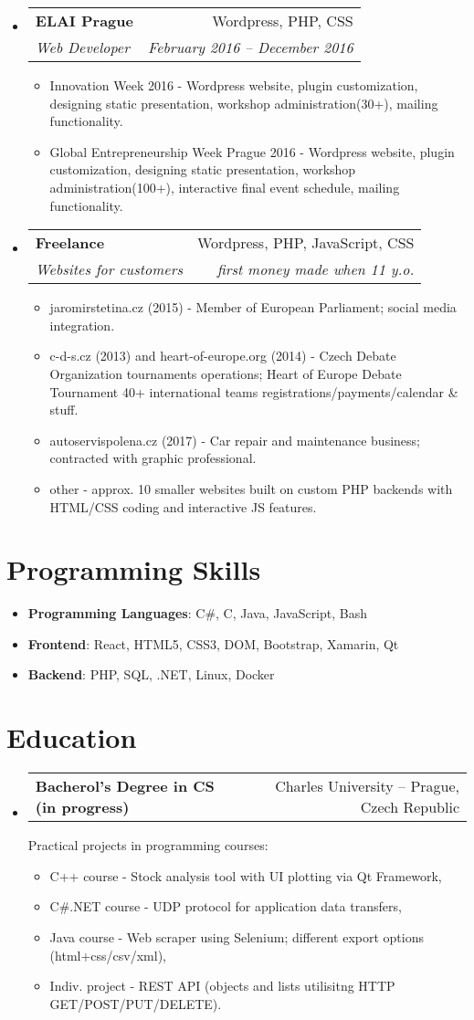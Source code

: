 \documentclass[letterpaper,11pt]{article}
\makeatletter
\newcommand{\sitem}[1]{\item #1 \vspace{-2pt}}
\newcommand{\resumeSubheading}[4]{
  \vspace{-1pt}\item
    \begin{tabular*}{0.97\textwidth}[t]{l@{\extracolsep{\fill}}r}
      \textbf{#1} & #2 \\
      \textit{\small#3} & \textit{\small #4} \\
    \end{tabular*}\vspace{-5pt}
}
\newcommand{\resumeSubheadingg}[2]{
  \vspace{-1pt}\item
    \begin{tabular*}{0.97\textwidth}[t]{l@{\extracolsep{\fill}}r}
      \textbf{#1} & #2
    \end{tabular*}\vspace{-5pt}
}
\newenvironment{subheadingListing}{\begin{itemize}[leftmargin=*]}{\end{itemize}}
\newenvironment{resumeList}{\begin{itemize}}{\end{itemize}\vspace{-5pt}}
\newcommand{\CC}{C\nolinebreak\hspace{-.05em}\raisebox{.4ex}{\tiny\bf +}\nolinebreak\hspace{-.10em}\raisebox{.4ex}{\tiny\bf +}}
\makeatother
\begin{document}
\begin{subheadingListing}
  \resumeSubheading
  {ELAI Prague}{Wordpress, PHP, CSS}
  {Web Developer}{February 2016 – December 2016}
  \begin{resumeList}
    \sitem{Innovation Week 2016 - Wordpress website, plugin customization, designing static presentation, workshop administration(30+), mailing functionality.}
    \sitem{Global Entrepreneurship Week Prague 2016 - Wordpress website, plugin customization, designing static presentation, workshop administration(100+), interactive final event schedule, mailing functionality.}
  \end{resumeList}

  \resumeSubheading
  {Freelance}{Wordpress, PHP, JavaScript, CSS}
  {Websites for customers}{first money made when 11 y.o.}
  \begin{resumeList}
    \sitem{jaromirstetina.cz (2015) - Member of European Parliament; social media integration.}
    \sitem{c-d-s.cz (2013) and heart-of-europe.org (2014) - Czech Debate Organization tournaments operations; Heart of Europe Debate Tournament 40+ international teams registrations/payments/calendar \& stuff. }
    \sitem{autoservispolena.cz (2017) - Car repair and maintenance business; contracted with graphic professional.}  
    \sitem{other - approx. 10 smaller websites built on custom PHP backends with HTML/CSS coding and interactive JS features.}  
  \end{resumeList}

\end{subheadingListing}


\section{Programming Skills}
\begin{subheadingListing}
  \sitem{
    \textbf{Programming Languages}{: C\#, \CC, Java, JavaScript, Bash}
  }
  \sitem{
    \textbf{Frontend}{: React, HTML5, CSS3, DOM, Bootstrap, Xamarin, Qt}
  }
  \sitem{
    \textbf{Backend}{: PHP, SQL, .NET, Linux, Docker}
  }
\end{subheadingListing}


\section{Education}
\begin{subheadingListing}

  \resumeSubheadingg
  {Bacherol's Degree in CS (in progress)}{Charles University – Prague, Czech Republic}

  Practical projects in programming courses:
  \begin{resumeList}
    \sitem{C++ course - Stock analysis tool with UI plotting via Qt Framework,}
    \sitem{C\#.NET course - UDP protocol for application data transfers,}
    \sitem{Java course - Web scraper using Selenium; different export options (html+css/csv/xml),}
    \sitem{Indiv. project - REST API (objects and lists utilisitng HTTP GET/POST/PUT/DELETE).}
  \end{resumeList}
\end{subheadingListing}
\end{document}
